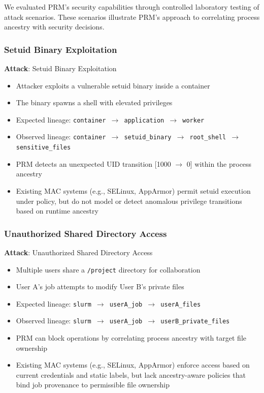 \documentclass[conference]{IEEEtran}
\begin{document}
We evaluated PRM's security capabilities through controlled laboratory testing of attack scenarios. These scenarios illustrate PRM's approach to correlating process ancestry with security decisions.

\subsubsection{Setuid Binary Exploitation}
\textbf{Attack}: Setuid Binary Exploitation
\begin{itemize}
\item Attacker exploits a vulnerable setuid binary inside a container
\item The binary spawns a shell with elevated privileges
\item Expected lineage: \texttt{container $\rightarrow$ application $\rightarrow$ worker}
\item Observed lineage: \texttt{container $\rightarrow$ setuid\_binary $\rightarrow$ root\_shell $\rightarrow$ sensitive\_files}
\item PRM detects an unexpected UID transition [1000 $\rightarrow$ 0] within the process ancestry
\item Existing MAC systems (e.g., SELinux, AppArmor) permit setuid execution under policy, but do not model or detect anomalous privilege transitions based on runtime ancestry
\end{itemize}

\subsubsection{Unauthorized Shared Directory Access}
\textbf{Attack}: Unauthorized Shared Directory Access
\begin{itemize}
\item Multiple users share a \texttt{/project} directory for collaboration
\item User A's job attempts to modify User B's private files
\item Expected lineage: \texttt{slurm $\rightarrow$ userA\_job $\rightarrow$ userA\_files}
\item Observed lineage: \texttt{slurm $\rightarrow$ userA\_job $\rightarrow$ userB\_private\_files}
\item PRM can block operations by correlating process ancestry with target file ownership
\item Existing MAC systems (e.g., SELinux, AppArmor) enforce access based on current credentials and static labels, but lack ancestry-aware policies that bind job provenance to permissible file ownership
\end{itemize}
\end{document}
